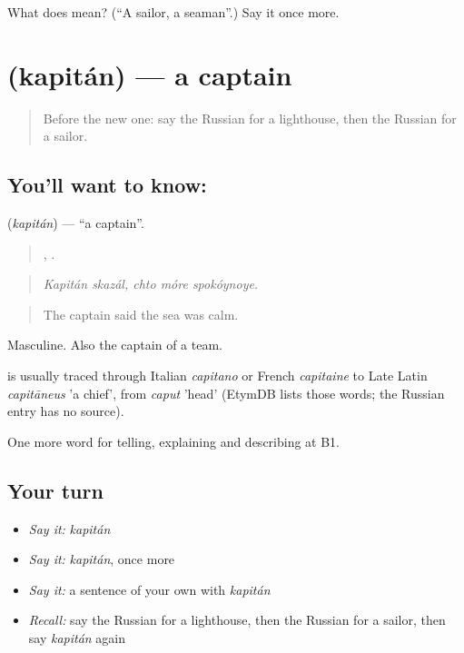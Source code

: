 \begin{tcolorbox}[breakable,colback=teal!4,colframe=teal!35!black,title={Before you move on}]
What does  mean? (\textquotedblleft{}A sailor, a seaman\textquotedblright{}.) Say it once more.
\end{tcolorbox}
\section[\texorpdfstring{\ru{капитан} (kapitán)}{капитан (kapitán)}]{ (kapitán) — a captain}

\label{lesson:RU-C427-kapitan}



\begin{quote}
Before the new one: say the Russian for a lighthouse, then the Russian for a sailor.
\end{quote}

\subsection*{You'll want to know: }
\textbf{} (\emph{kapitán}) — \textquotedblleft{}a captain\textquotedblright{}.

\begin{quote}
 ,   .
\end{quote}

\begin{quote}
\emph{Kapitán skazál, chto móre spokóynoye.}
\end{quote}

\begin{quote}
The captain said the sea was calm.
\end{quote}

Masculine. Also the captain of a team.

\begin{cousinweb}
\emph{} is usually traced through Italian \emph{capitano} or French \emph{capitaine} to Late Latin \emph{capitāneus} 'a chief', from \emph{caput} 'head' (EtymDB lists those words; the Russian entry has no source).
\end{cousinweb}

\begin{grammarlens}[title={What you've built}]
One more word for telling, explaining and describing at B1.
\end{grammarlens}

\subsection*{Your turn}
\begin{itemize}
\raggedright
  \item \emph{Say it:} \emph{kapitán}
  \item \emph{Say it:} \emph{kapitán}, once more
  \item \emph{Say it:} a sentence of your own with \emph{kapitán}
  \item \emph{Recall:} say the Russian for a lighthouse, then the Russian for a sailor, then say \emph{kapitán} again
\end{itemize}

